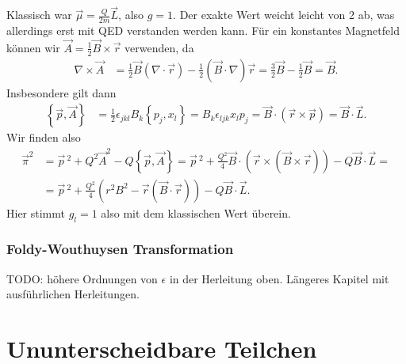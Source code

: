 \documentclass[english, parskip=full]{scrreport}
\newcommand{\kla}{}
\newcommand{\klammer}{}
\begin{document}
Klassisch war $\vec{\mu} = \frac{Q}{2m}\vec{L}$, also $g=1$. 
Der exakte Wert weicht leicht von 2 ab, was allerdings erst mit QED verstanden werden kann.
Für ein konstantes Magnetfeld können wir $\vec{A} = \frac{1}{2}\vec{B}\times\vec{r}$ verwenden, da 
\begin{align}
\nabla\times\vec{A} &= \frac{1}{2}\vec{B}\kla\left( \nabla\cdot\vec{r} \right) - \frac{1}{2}\kla\left( \vec{B}\cdot\nabla \right)\vec{r} = \frac{3}{2}\vec{B} - \frac{1}{2}\vec{B} = \vec{B}.
\end{align}
Insbesondere gilt dann
\begin{align}
\klammer\left\{ \vec{p}, \vec{A} \right\} &= \frac{1}{2}\epsilon_{jkl}  B_k \klammer\left\{ p_j, x_l \right\} = B_k\epsilon_{ljk}x_lp_j = \vec{B}\cdot\kla\left( \vec{r}\times\vec{p} \right) = \vec{B}\cdot\vec{L}.
\end{align}
Wir finden also 
\begin{align}
\vec{\pi}^2 &= \vec{p}\,^2 + Q^2\vec{A}^2 - Q\klammer\left\{ \vec{p}, \vec{A} \right\} = \vec{p}\,^2 + \frac{Q^2}{4}\vec{B}\cdot\kla\left( \vec{r}\times \kla\left( \vec{B}\times\vec{r} \right) \right) - Q\vec{B}\cdot\vec{L} = \\
&= \vec{p}\,^2 + \frac{Q^2}{4}\kla\left( r^2B^2 - \vec{r}\kla\left( \vec{B}\cdot\vec{r} \right) \right) - Q\vec{B}\cdot\vec{L}.
\end{align}
Hier stimmt $g_l=1$ also mit dem klassischen Wert überein.
\subsubsection{Foldy-Wouthuysen Transformation}
TODO: höhere Ordnungen von $\epsilon$ in der Herleitung oben. Längeres Kapitel mit ausführlichen Herleitungen.

\section{Ununterscheidbare Teilchen}
\end{document}
